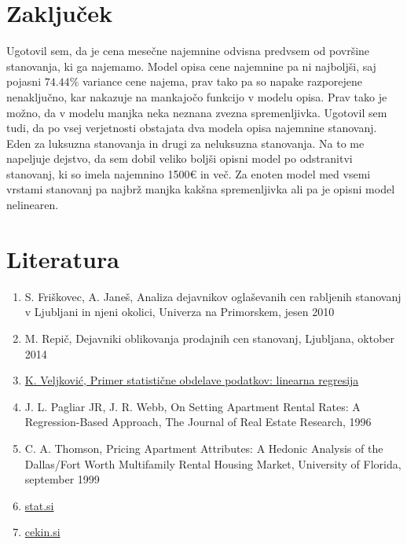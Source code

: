 \documentclass[a4paper, 12pt]{article}
\begin{document}
\section{Zaključek}

Ugotovil sem, da je cena mesečne najemnine odvisna predvsem od površine
stanovanja, ki ga najemamo. Model opisa cene najemnine pa ni najboljši, saj
pojasni $ 74.44\% $ variance cene najema, prav tako pa so napake razporejene
nenaključno, kar nakazuje na mankajočo funkcijo v modelu opisa. Prav tako je
možno, da v modelu manjka neka neznana zvezna spremenljivka. Ugotovil sem tudi,
da po vsej verjetnosti obstajata dva modela opisa najemnine stanovanj. Eden za
luksuzna stanovanja in drugi za neluksuzna stanovanja. Na to me napeljuje
dejstvo, da sem dobil veliko boljši opisni model po odstranitvi stanovanj, ki
so imela najemnino 1500€ in več. Za enoten model med vsemi vrstami stanovanj pa
najbrž manjka kakšna spremenljivka ali pa je opisni model nelinearen.

\section{Literatura}

\begin{enumerate}
	\item S. Friškovec, A. Janeš, Analiza dejavnikov oglaševanih cen rabljenih
		stanovanj v Ljubljani in njeni okolici, Univerza na Primorskem, jesen 2010
	\item M. Repič, Dejavniki oblikovanja prodajnih cen stanovanj, Ljubljana,
		oktober 2014
	\item \href{https://gitlab.com/ul-fri/ovs/projekt/-/blob/master/regresija.pdf}
		{K. Veljković, Primer statistične obdelave podatkov: linearna regresija}
	\item J. L. Pagliar JR, J. R. Webb, On Setting Apartment Rental Rates: A
		Regression-Based Approach, The Journal of Real Estate Research, 1996
	\item C. A. Thomson, Pricing Apartment Attributes: A Hedonic Analysis of the
		Dallas/Fort Worth Multifamily Rental Housing Market, University of Florida,
		september 1999
	\item \href{https://www.stat.si/statweb/News/Index/7570}{stat.si}
	\item \href{https://cekin.si/nepremicnine/trnova-pot-do-lastnega-doma-zakaj-mora-biti-tako.html}{cekin.si}
\end{enumerate}
\end{document}
